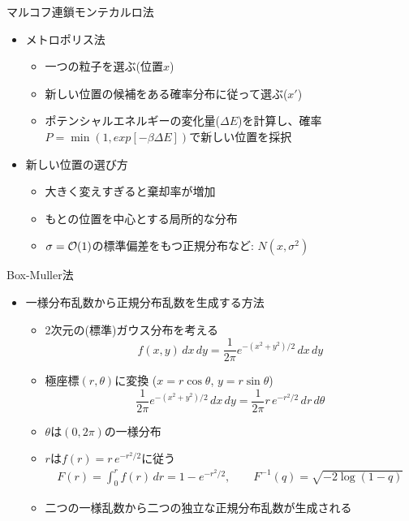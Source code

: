 \documentclass[dvipdfmx]{beamer}
\begin{document}
\begin{frame}[t,fragile]{マルコフ連鎖モンテカルロ法}
  \begin{itemize}
    \setlength{\itemsep}{1em}
  \item メトロポリス法
    \begin{itemize}
    \item 一つの粒子を選ぶ(位置$x$)
    \item 新しい位置の候補をある確率分布に従って選ぶ($x'$)
    \item ポテンシャルエネルギーの変化量($\Delta E$)を計算し、確率$P=\min(1,exp[-\beta\Delta E])$で新しい位置を採択
    \end{itemize}
  \item 新しい位置の選び方
    \begin{itemize}
    \item 大きく変えすぎると棄却率が増加
    \item もとの位置を中心とする局所的な分布
    \item $\sigma={\cal O}(1)$の標準偏差をもつ正規分布など: $N(x, \sigma^2)$
    \end{itemize}
  \end{itemize}
\end{frame}

\begin{frame}[t,fragile]{Box-Muller法}
  \begin{itemize}
    \setlength{\itemsep}{1em}
  \item 一様分布乱数から正規分布乱数を生成する方法
    \begin{itemize}
    \item 2次元の(標準)ガウス分布を考える
      \[
      f(x,y)\,dx\,dy= \frac{1}{2\pi} e^{-(x^2+y^2)/2} \,dx\,dy
      \]
    \item 極座標$(r,\theta)$に変換 ($x=r\cos\theta$, $y=r\sin\theta$)
      \[
      \frac{1}{2\pi} e^{-(x^2+y^2)/2} \,dx\,dy = \frac{1}{2\pi} r \, e^{-r^2/2} \,dr\,d\theta
      \]
    \item $\theta$は$(0,2\pi)$の一様分布
    \item $r$は$f(r) = r \, e^{-r^2/2}$に従う
      \begin{align*}
        F(r) = \int_0^r f(r) \, dr = 1 - e^{-r^2/2}, \qquad F^{-1}(q) = \sqrt{- 2 \log(1-q)}
      \end{align*}
    \item 二つの一様乱数から二つの独立な正規分布乱数が生成される
    \end{itemize}
  \end{itemize}
\end{frame}
\end{document}
